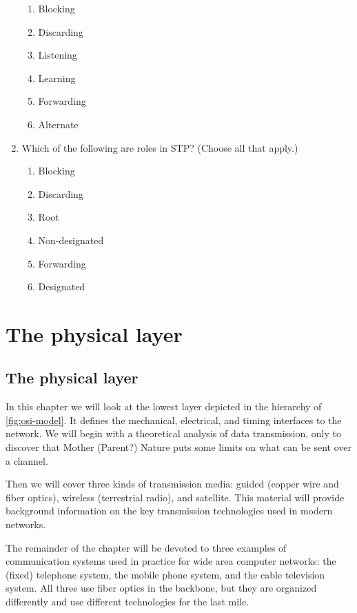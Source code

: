 \documentclass[b5paper,11pt]{memoir}
\begin{document}
\begin{enumerate}
  \begin{enumerate}
  \tightlist
  \item
    Blocking
  \item
    Discarding
  \item
    Listening
  \item
    Learning
  \item
    Forwarding
  \item
    Alternate
  \end{enumerate}
\item
  Which of the following are roles in STP? (Choose all that apply.)

  \begin{enumerate}
  \tightlist
  \item
    Blocking
  \item
    Discarding
  \item
    Root
  \item
    Non-designated
  \item
    Forwarding
  \item
    Designated
  \end{enumerate}
\end{enumerate}



\part{The physical layer}


\chapter{The physical layer}

In this chapter we will look at the lowest layer depicted in the hierarchy of \vref{fig:osi-model}.
It defines the mechanical, electrical, and timing interfaces to the network.
We will begin with a theoretical analysis of data transmission, only to discover that Mother (Parent?) Nature puts some limits on what can be sent over a channel.

Then we will cover three kinds of transmission media: guided (copper
wire and fiber optics), wireless (terrestrial radio), and satellite.
This material will provide background information on the key
transmission technologies used in modern networks.

The remainder of the chapter will be devoted to three examples of
communication systems used in practice for wide area computer networks:
the (fixed) telephone system, the mobile phone system, and the cable
television system. All three use fiber optics in the backbone, but they
are organized differently and use different technologies for the last
mile.
\end{document}
